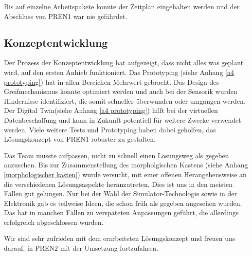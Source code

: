 \documentclass[../main.tex]{subfiles}
\begin{document}
Bis auf einzelne Arbeitspakete konnte der Zeitplan eingehalten werden und der Abschluss von PREN1 war nie gefährdet.

\subsection{Konzeptentwicklung}

Der Prozess der Konzeptentwicklung hat aufgezeigt, dass nicht alles was geplant wird, auf den ersten Anhieb funktioniert. Das Prototyping (siehe Anhang \ref{a4 prototyping}) hat in allen Bereichen Mehrwert gebracht. Das Design des Greifmechanismus konnte optimiert werden und auch bei der Sensorik wurden Hindernisse identifiziert, die somit schneller überwunden oder umgangen werden. Der Digital Twin(siehe Anhang \ref{a4 prototyping}) hilft bei der virtuellen Datenbeschaffung und kann in Zukunft potentiell für weitere Zwecke verwendet werden. Viele weitere Tests und Prototyping haben dabei geholfen, das Lösungskonzept von PREN1 robuster zu gestalten.

Das Team musste aufpassen, nicht zu schnell einen Lösungsweg als gegeben anzusehen. Bis zur Zusammenstellung des morpholgischen Kastens (siehe Anhang \ref{morphologischer kasten}) wurde versucht, mit einer offenen Herangehensweise an die verschiedenen Lösungsaspekte heranzutreten. Dies ist uns in den meisten Fällen gut gelungen. Nur bei der Wahl der Simulator-Technologie sowie in der Elektronik gab es teilweise Ideen, die schon früh als gegeben angesehen wurden. Das hat in manchen Fällen zu verspäteten Anpassungen geführt, die allerdings erfolgreich abgeschlossen wurden.

Wir sind sehr zufrieden mit dem erarbeiteten Lösungskonzept und freuen uns darauf, in PREN2 mit der Umsetzung fortzufahren.
\end{document}
